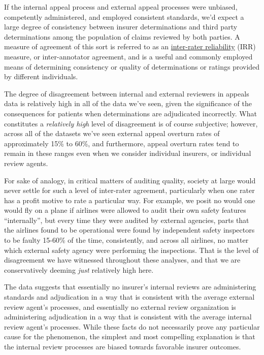 \documentclass[12pt, a4paper,twoside,parskip=full]{report}
\theoremstyle{plain} %
\theoremstyle{definition} %
\theoremstyle{remark} %
\numberwithin{equation}{chapter}
\begin{document}
		If the internal appeal process and external appeal processes were unbiased, competently administered, and employed consistent standards, we'd expect a large degree of consistency between insurer determinations and third party determinations among the population of claims reviewed by both parties. A measure of agreement of this sort is referred to as an \href{https://en.wikipedia.org/wiki/Inter-rater_reliability}{inter-rater reliability} (IRR) measure, or inter-annotator agreement, and is a useful and commonly employed means of determining consistency or quality of determinations or ratings provided by different individuals.
		
		The degree of disagreement between internal and external reviewers in appeals data is relatively high in all of the data we've seen, given the significance of the consequences for patients when determinations are adjudicated incorrectly. What constitutes a \emph{relatively high} level of disagreement is of course subjective; however, across all of the datasets we've seen external appeal overturn rates of approximately 15\% to 60\%, and furthermore, appeal overturn rates tend to remain in these ranges even when we consider individual insurers, or individual review agents.
		
		For sake of analogy, in critical matters of auditing quality, society at large would never settle for such a level of inter-rater agreement, particularly when one rater has a profit motive to rate a particular way. For example, we posit no would one would fly on a plane if airlines were allowed to audit their own safety features ``internally'', but every time they were audited by external agencies, parts that the airlines found to be operational were found by independent safety inspectors to be faulty 15-60\% of the time, consistently, and across all airlines, no matter which external safety agency were performing the inspections. That is the level of disagreement we have witnessed throughout these analyses, and that we are conservatively deeming \emph{just} relatively high here.
		
		The data suggests that essentially no insurer's internal reviews are administering standards and adjudication in a way that is consistent with the average external review agent's processes, and essentially no external review organization is administering adjudication in a way that is consistent with the average internal review agent's processes. While these facts do not necessarily prove any particular cause for the phenomenon, the simplest and most compelling explanation is that the internal review processes are biased towards favorable insurer outcomes.
		
\end{document}
